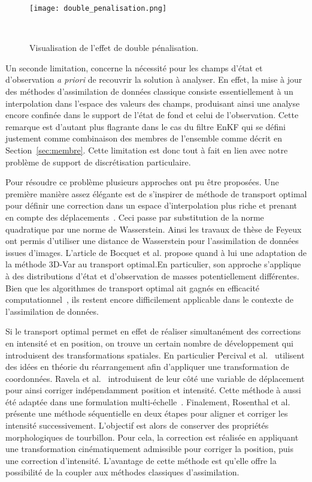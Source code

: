 \begin{figure}[h]
    \centering
    \texttt{[image: double\_penalisation.png]}
    \caption{Visualisation de l'effet de double pénalisation.}~\label{fig:double_penalization_error}
\end{figure}

Un seconde limitation, concerne la nécessité pour les champs d'état et d'observation \textit{a priori} de recouvrir la solution à analyser. En effet, la mise à jour des méthodes d'assimilation de données classique consiste essentiellement à un interpolation dans l'espace des valeurs des champs, produisant ainsi une analyse encore confinée dans le support de l'état de fond et celui de l'observation. Cette remarque est d'autant plus flagrante dans le cas du filtre EnKF qui se défini justement comme combinaison des membres de l'ensemble comme décrit en Section~\ref{sec:membre}. Cette limitation est donc tout à fait en lien avec notre problème de support de discrétisation particulaire.


Pour résoudre ce problème plusieurs approches ont pu être proposées. Une première manière assez élégante est de s'inspirer de méthode de transport optimal pour définir une correction dans un espace d'interpolation plus riche et prenant en compte des déplacements~\cite{villani2009optimal,benamou_computational_2000}. Ceci passe par substitution de la norme quadratique par une norme de Wasserstein. Ainsi les travaux de thèse de Feyeux~\cite{feyeux_transport_2016} ont permis d'utiliser une distance de Wasserstein pour l'assimilation de données issues d'images. L'article de Bocquet et al. \cite{bocquet_bridging_2023} propose quand à lui une adaptation de la méthode 3D-Var au transport optimal.En particulier, son approche s'applique à des distributions d'état et d'observation de masses potentiellement différentes. Bien que les algorithmes de transport optimal ait gagnés en efficacité computationnel~\cite{cuturi_2014,peyre_cuturi_2019,Simsekli2018SlicedWassersteinFN}, ils restent encore difficilement applicable dans le contexte de l'assimilation de données.

Si le transport optimal permet en effet de réaliser simultanément des corrections en intensité et en position, on trouve un certain nombre de développement qui introduisent des transformations spatiales. En particulier Percival et al.~\cite{percival_department_2008} utilisent des idées en théorie du réarrangement afin d'appliquer une transformation de coordonnées. Ravela et al.~\cite{ravela_data_2007} introduisent de leur côté une variable de déplacement pour ainsi corriger indépendamment position et intensité. Cette méthode à aussi été adaptée dans une formulation multi-échelle~\cite{ying_multiscale_2019,ying_improving_2023}. Finalement, Rosenthal et al.~\cite{rosenthal_displacement_2017} présente une méthode séquentielle en deux étapes pour aligner et corriger les intensité successivement. L'objectif est alors de conserver des propriétés morphologiques de tourbillon. Pour cela, la correction est réalisée en appliquant une transformation cinématiquement admissible pour corriger la position, puis une correction d'intensité. L'avantage de cette méthode est qu'elle offre la possibilité de la coupler aux méthodes classiques d'assimilation.

